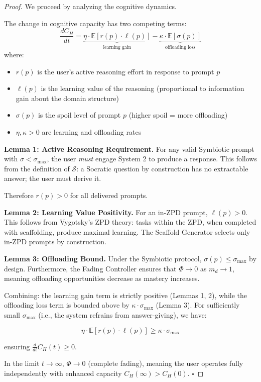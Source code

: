 \documentclass[12pt,a4paper]{article}
\theoremstyle{remark}
\newcommand{\CS}{\mathcal{S}}
\newcommand{\E}{\mathbb{E}}
\begin{document}
\begin{proof}
We proceed by analyzing the cognitive dynamics.

The change in cognitive capacity has two competing terms:
\begin{equation}
\frac{dC_H}{dt} = \underbrace{\eta \cdot \E[r(p) \cdot \ell(p)]}_{\text{learning gain}} - \underbrace{\kappa \cdot \E[\sigma(p)]}_{\text{offloading loss}}
\label{eq:dynamics}
\end{equation}
where:
\begin{itemize}
    \item $r(p)$ is the user's active reasoning effort in response to prompt $p$
    \item $\ell(p)$ is the learning value of the reasoning (proportional to information gain about the domain structure)
    \item $\sigma(p)$ is the spoil level of prompt $p$ (higher spoil = more offloading)
    \item $\eta, \kappa > 0$ are learning and offloading rates
\end{itemize}

\textbf{Lemma 1: Active Reasoning Requirement.} For any valid Symbiotic prompt with $\sigma < \sigma_{\max}$, the user \emph{must} engage System 2 to produce a response. This follows from the definition of $\CS$: a Socratic question by construction has no extractable answer; the user must derive it.

Therefore $r(p) > 0$ for all delivered prompts.

\textbf{Lemma 2: Learning Value Positivity.} For an in-ZPD prompt, $\ell(p) > 0$. This follows from Vygotsky's ZPD theory: tasks within the ZPD, when completed with scaffolding, produce maximal learning. The Scaffold Generator selects only in-ZPD prompts by construction.

\textbf{Lemma 3: Offloading Bound.} Under the Symbiotic protocol, $\sigma(p) \leq \sigma_{\max}$ by design. Furthermore, the Fading Controller ensures that $\Phi \to 0$ as $m_d \to 1$, meaning offloading opportunities decrease as mastery increases.

Combining: the learning gain term is strictly positive (Lemmas 1, 2), while the offloading loss term is bounded above by $\kappa \cdot \sigma_{\max}$ (Lemma 3). For sufficiently small $\sigma_{\max}$ (i.e., the system refrains from answer-giving), we have:

\begin{equation}
\eta \cdot \E[r(p) \cdot \ell(p)] \geq \kappa \cdot \sigma_{\max}
\end{equation}

ensuring $\frac{d}{dt}C_H(t) \geq 0$.

In the limit $t \to \infty$, $\Phi \to 0$ (complete fading), meaning the user operates fully independently with enhanced capacity $C_H(\infty) > C_H(0)$. $\square$
\end{proof}
\end{document}
